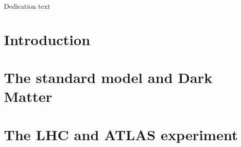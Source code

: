\documentclass[11pt,openright,oneside,letterpaper,onecolumn]{report} %
\begin{document}
\pagestyle{empty}

\thesistitlepage
\thesiscopyrightpage

\thesisabstract


\pagestyle{plain}

\setlength{\footskip}{0.5in}

\setcounter{tocdepth}{3}
\renewcommand{\contentsname}{Table of Contents}
\tableofcontents
\cleardoublepage

\listoffigures
\cleardoublepage

\listoftables
\cleardoublepage


\cleardoublepage

\thispagestyle{plain}
\strut \vfill
\centerline{\LARGE
Dedication text
}
\vfill \strut
\cleardoublepage


\pagestyle{headings}

%
%
\setlength{\textheight}{8.5in}
\setlength{\footskip}{0in}

 {%
\fancyhf{}
\fancyhead[LE,RO]{\thepage}
\fancyhead[RE,LO]{\itshape \leftmark}
\renewcommand{\headrulewidth}{0pt}
}
\pagestyle{plain}

\part{Introduction}
\label{sec:introduction}


\part{The standard model and Dark Matter}
\label{sec:theory-part}


\part{The LHC and ATLAS experiment}
\label{sec:experiment-part}

\end{document}
